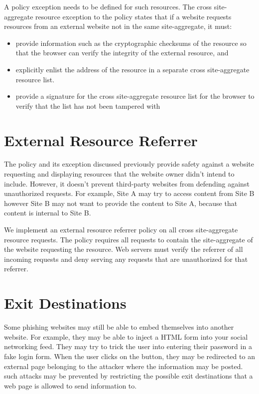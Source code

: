A policy exception needs to be defined for such resources. The cross site-aggregate resource exception to the policy states that if a website requests resources from an external website not in the same site-aggregate, it must:
\begin{itemize}
    \item provide information such as the cryptographic checksums of the resource so that the browser can verify the integrity of the external resource, and
    \item explicitly enlist the address of the resource in a separate cross site-aggregate resource list.
    \item provide a signature for the cross site-aggregate resource list for the browser to verify that the list has not been tampered with
\end{itemize}

\section{External Resource Referrer}

The policy and its exception discussed previously provide safety against a website requesting and displaying resources that the website owner didn't intend to include. However, it doesn't prevent third-party websites from defending against unauthorized requests. For example, Site A may try to access content from Site B however Site B may not want to provide the content to Site A, because that content is internal to Site B.

We implement an external resource referrer policy on all cross site-aggregate resource requests. The policy requires all requests to contain the site-aggregate of the website requesting the resource. Web servers must verify the referrer of all incoming requests and deny serving any requests that are unauthorized for that referrer.

\section{Exit Destinations}

Some phishing websites may still be able to embed themselves into another website. For example, they may be able to inject a HTML form into your social networking feed. They may try to trick the user into entering their password in a fake login form. When the user clicks on the button, they may be redirected to an external page belonging to the attacker where the information may be posted. such attacks may be prevented by restricting the possible exit destinations that a web page is allowed to send information to.


